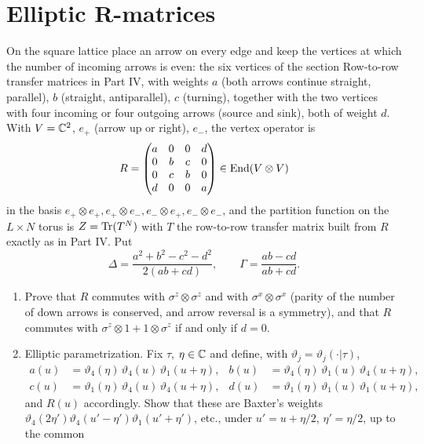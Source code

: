 \section{Elliptic R-matrices}

\begin{exercise}
On the square lattice place an arrow on every edge and keep the vertices at
which the number of incoming arrows is even: the six vertices of the
section Row-to-row transfer matrices in Part IV, with weights $a$
(both arrows continue straight, parallel), $b$ (straight, antiparallel),
$c$ (turning), together with the two vertices with four incoming or four
outgoing arrows (source and sink), both of weight $d$.  With $V=\mathbb C^2$,
$e_+$ (arrow up or right), $e_-$, the vertex operator is
\[
 R=\begin{pmatrix}a&0&0&d\\0&b&c&0\\0&c&b&0\\d&0&0&a\end{pmatrix}\in\operatorname{End}(V\otimes V)
\]
in the basis $e_+\otimes e_+,e_+\otimes e_-,e_-\otimes e_+,e_-\otimes e_-$,
and the partition function on the $L\times N$ torus is $Z=\operatorname{Tr}(T^N)$ with
$T$ the row-to-row transfer matrix built from $R$ exactly as in Part IV.
Put
\[
 \Delta=\frac{a^2+b^2-c^2-d^2}{2(ab+cd)},\qquad\Gamma=\frac{ab-cd}{ab+cd}.
\]
\begin{enumerate}[label=(\alph*)]
\item Prove that $R$ commutes with $\sigma^z\otimes\sigma^z$ and with
$\sigma^x\otimes\sigma^x$ (parity of the number of down arrows is conserved,
and arrow reversal is a symmetry), and that $R$ commutes with
$\sigma^z\otimes1+1\otimes\sigma^z$ if and only if $d=0$.
\item Elliptic parametrization.  Fix $\tau$, $\eta\in\mathbb C$ and define, with
$\vartheta_j=\vartheta_j(\cdot|\tau)$,
\begin{align*}
 a(u)&=\vartheta_4(\eta)\,\vartheta_4(u)\,\vartheta_1(u+\eta),&
 b(u)&=\vartheta_4(\eta)\,\vartheta_1(u)\,\vartheta_4(u+\eta),\\
 c(u)&=\vartheta_1(\eta)\,\vartheta_4(u)\,\vartheta_4(u+\eta),&
 d(u)&=\vartheta_1(\eta)\,\vartheta_1(u)\,\vartheta_1(u+\eta),
\end{align*}
and $R(u)$ accordingly.  Show that these are Baxter's weights
\cite{baxter-eightvertex} $\vartheta_4(2\eta')\vartheta_4(u'-\eta')\vartheta_1(u'+\eta')$,
etc., under $u'=u+\eta/2$, $\eta'=\eta/2$, up to the common

\end{enumerate}
\end{exercise}
